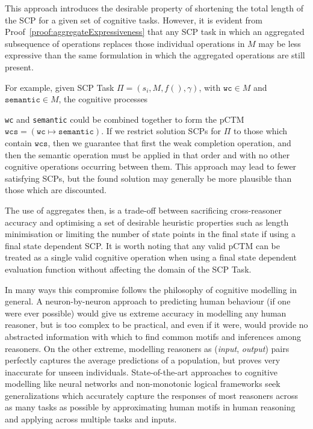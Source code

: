 This approach introduces the desirable property of shortening the total length of the SCP for a given set of cognitive tasks. However, it is evident from Proof~\ref{proof:aggregateExpressiveness} that any SCP task in which an aggregated subsequence of operations replaces those individual operations in $M$ may be less expressive than the same formulation in which the aggregated operations are still present.

For example, given SCP Task $\Pi=(s_i,M,f(),\gamma)$, with $\texttt{wc} \in M$ and $\texttt{semantic}\in M$, the cognitive processes {\texttt{wc} and \texttt{semantic} could be combined together to form the pCTM $\texttt{wcs}=(\texttt{wc} \longmapsto \texttt{semantic})$. If we restrict solution SCPs for $\Pi$ to those which contain $\texttt{wcs}$, then we guarantee that first the weak completion operation, and then the semantic operation must be applied in that order and with no other cognitive operations occurring between them. This approach may lead to fewer satisfying SCPs, but the found solution may generally be more plausible than those which are discounted.

The use of aggregates then, is a trade-off between sacrificing cross-reasoner accuracy and optimising a set of desirable heuristic properties such as length minimisation or limiting the number of state points in the final state if using a final state dependent SCP. It is worth noting that any valid pCTM can be treated as a single valid cognitive operation when using a final state dependent evaluation function without affecting the domain of the SCP Task.

In many ways this compromise follows the philosophy of cognitive modelling in general. A neuron-by-neuron approach to predicting human behaviour (if one were ever possible) would give us extreme accuracy in modelling any human reasoner, but is too complex to be practical, and even if it were, would provide no abstracted information with which to find common motifs and inferences among reasoners. On the other extreme, modelling reasoners as (\textit{input}, \textit{output}) pairs perfectly captures the average predictions of a population, but proves very inaccurate for unseen individuals. State-of-the-art approaches to cognitive modelling like neural networks and non-monotonic logical frameworks seek generalizations which accurately capture the responses of most reasoners across as many tasks as possible by approximating human motifs in human reasoning and applying across multiple tasks and inputs.

}
